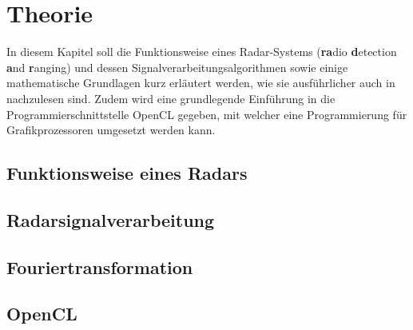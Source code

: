 \documentclass[a4paper,12pt,oneside,german,toc=bibliography]{scrbook}
\theoremstyle{definition}
\theoremstyle{plain}
\numberwithin{equation}{section}
\begin{document}


\tableofcontents


\chapter{Theorie}
In diesem Kapitel soll die Funktionsweise eines Radar-Systems (\textbf{ra}dio \textbf{d}etection \textbf{a}nd \textbf{r}anging) und dessen Signalverarbeitungsalgorithmen sowie einige mathematische Grundlagen kurz erläutert werden, wie sie ausführlicher auch in \cite{Richards,RSH,Ludloff} nachzulesen sind. Zudem wird eine grundlegende Einführung in die Programmierschnittstelle OpenCL gegeben, mit welcher eine Programmierung für Grafikprozessoren umgesetzt werden kann.

\section{Funktionsweise eines Radars} 
    
    
    


\section{Radarsignalverarbeitung}
    
    
    
    


\section{Fouriertransformation}
    
    
    




\section{OpenCL}


\end{document}
